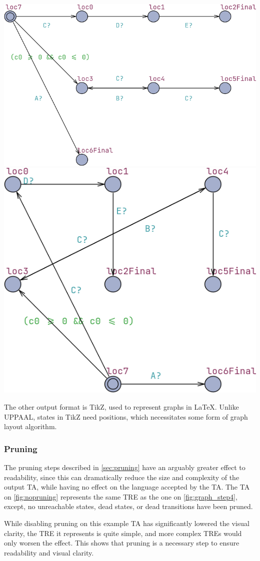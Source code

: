 \begin{center}
    \includegraphics[width=0.8\columnwidth]{Documents/Diagrams/ReadabilityFigures/treat.png}
    \includegraphics[width=0.6\columnwidth]{Documents/Diagrams/ReadabilityFigures/uppaal.png}
\end{center}
\vspace{1em}

The other output format is TikZ, used to represent graphs in LaTeX. Unlike UPPAAL, states in TikZ need positions, which necessitates some form of graph layout algorithm.

\subsubsection{Pruning}

The pruning steps described in \cref{sec:pruning} have an arguably greater effect to readability, since this can dramatically reduce the size and complexity of the output TA, while having no effect on the language accepted by the TA.
The TA on \cref{fig:nopruning} represents the same TRE as the one on \cref{fig:graph_step4}, except, no unreachable states, dead states, or dead transitions have been pruned.

\begin{center}
    
\end{center}

While disabling pruning on this example TA has significantly lowered the visual clarity, the TRE it represents is quite simple, and more complex TREs would only worsen the effect. This shows that pruning is a necessary step to ensure readability and visual clarity.